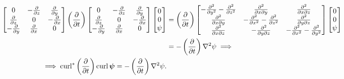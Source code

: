 \documentclass{article}
\numberwithin{equation}{section}
\begin{document}
\begin{align}\label{eqn:streamfunction-transient}
	\begin{bmatrix}{}
  	0& -\frac{\partial}{\partial z}&\frac{\partial}{\partial y} \\
  	\frac{\partial}{\partial z}& 0 &-\frac{\partial }{\partial x} \\
  	-\frac{\partial}{\partial y}&\frac{\partial }{\partial x} &0
	\end{bmatrix}
	\left(\frac{\partial}{\partial t}\right)
	\begin{bmatrix}{}
  	0& -\frac{\partial}{\partial z}&\frac{\partial}{\partial y} \\
  	\frac{\partial}{\partial z}& 0 &-\frac{\partial }{\partial x} \\
  	-\frac{\partial}{\partial y}&\frac{\partial }{\partial x} &0
	\end{bmatrix}
	\begin{bmatrix}
		0\\
		0\\
		\psi
	\end{bmatrix}&=
	\left(\frac{\partial}{\partial t}\right)
	\begin{bmatrix}
		-\frac{\partial^2}{\partial y^2}-\frac{\partial^2}{\partial z^2} & \frac{\partial^2}{\partial x\partial y} & \frac{\partial^2}{\partial x \partial z}\\
		\frac{\partial ^2}{\partial x \partial y} & -\frac{\partial ^2}{\partial x^2}-\frac{\partial ^2}{\partial z^2} & \frac{\partial ^2}{\partial y \partial z}\\
		\frac{\partial ^2}{\partial x \partial z} & -\frac{\partial ^2}{\partial y \partial z} & -\frac{\partial ^2}{\partial x^2}-\frac{\partial ^2}{\partial y^2}
	\end{bmatrix}
	\begin{bmatrix}
		0\\
		0\\
		\psi
	\end{bmatrix}
	\notag\\
	&=-\left(\frac{\partial}{\partial t}\right)\nabla^2\psi\implies
	\notag\\
	\implies \operatorname{curl}^*\left(\frac{\partial}{\partial t}\right)\operatorname{curl}\boldsymbol{\psi}=-\left(\frac{\partial}{\partial t}\right)\nabla^2\psi.
\end{align}
\end{document}
